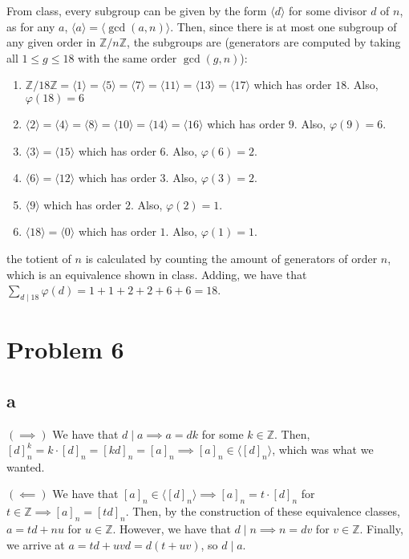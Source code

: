 \documentclass[12pt,letterpaper]{article}
\theoremstyle{definition}
\newcommand{\Z}{\mathbb{Z}}
\begin{document}
From class, every subgroup can be given by the form $\langle d \rangle$ for some divisor $d$ of $n$, as for any $a$, $\langle a \rangle = \langle \gcd(a,n) \rangle$. Then, since there is at most one subgroup of any given order in $\Z/n\Z$, the subgroups are (generators are computed by taking all $1 \leq g \leq 18$ with the same order $\gcd(g,n)$):
\begin{enumerate}
  \item $\Z/18\Z = \langle 1 \rangle = \langle 5 \rangle = \langle 7 \rangle = \langle 11 \rangle = \langle 13 \rangle = \langle 17 \rangle$ which has order $18$. Also, $\varphi(18) = 6$
  \item $\langle 2 \rangle = \langle 4 \rangle = \langle 8 \rangle = \langle 10 \rangle = \langle 14 \rangle = \langle 16 \rangle $ which has order $9$. Also, $\varphi(9) = 6$.
  \item $\langle 3 \rangle = \langle 15 \rangle$ which has order $6$. Also, $\varphi(6) = 2$.
  \item $\langle 6 \rangle = \langle 12 \rangle$ which has order $3$. Also, $\varphi(3) = 2$.
  \item $\langle 9 \rangle$ which has order $2$. Also, $\varphi(2) = 1$.
  \item $\langle 18 \rangle = \langle 0 \rangle$ which has order $1$. Also, $\varphi(1) = 1$.
\end{enumerate}
the totient of $n$ is calculated by counting the amount of generators of order $n$, which is an equivalence shown in class. Adding, we have that $\sum_{d \mid 18}\varphi(d) = 1 + 1 + 2 + 2 + 6 + 6 = 18$.

\section*{Problem 6}

\subsection*{a}

$(\implies)$ We have that $d \mid a \implies a = dk$ for some $k \in \Z$. Then, $[d]_{n}^{k} = k \cdot [d]_{n} = [kd]_{n} = [a]_{n} \implies [a]_{n} \in \langle [d]_{n} \rangle$, which was what we wanted.

$(\impliedby)$ We have that $[a]_{n} \in \langle [d]_{n} \rangle \implies [a]_{n} = t \cdot [d]_{n}$ for $t \in \Z \implies [a]_{n} = [td]_{n}$. Then, by the construction of these equivalence classes, $a = td + nu$ for $u \in \Z$. However, we have that $d\mid n \implies n =dv$ for $v \in \Z$. Finally, we arrive at $a = td + uvd = d(t + uv)$, so $d \mid a$.
\end{document}
